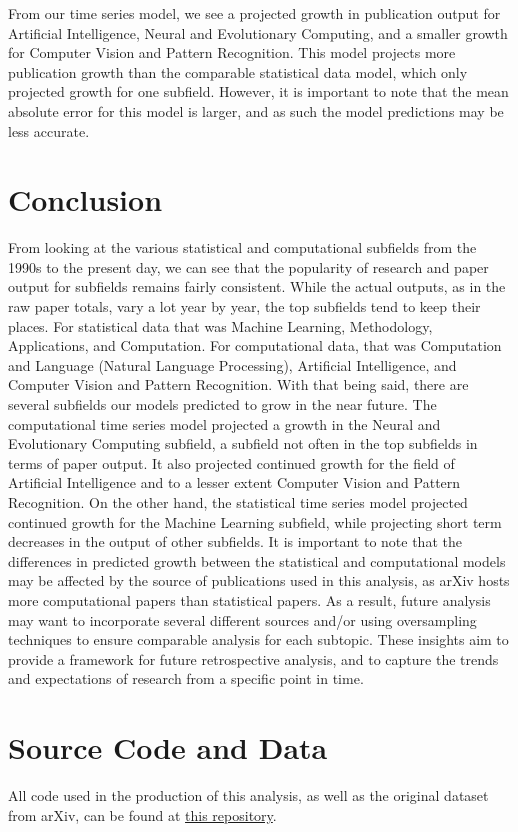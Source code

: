 \documentclass[
  12pt]{article}
\begin{document}
From our time series model, we see a projected growth in publication
output for Artificial Intelligence, Neural and Evolutionary Computing,
and a smaller growth for Computer Vision and Pattern Recognition. This
model projects more publication growth than the comparable statistical
data model, which only projected growth for one subfield. However, it is
important to note that the mean absolute error for this model is larger,
and as such the model predictions may be less accurate.

\section{Conclusion}\label{sec-conc}

From looking at the various statistical and computational subfields from
the 1990s to the present day, we can see that the popularity of research
and paper output for subfields remains fairly consistent. While the
actual outputs, as in the raw paper totals, vary a lot year by year, the
top subfields tend to keep their places. For statistical data that was
Machine Learning, Methodology, Applications, and Computation. For
computational data, that was Computation and Language (Natural Language
Processing), Artificial Intelligence, and Computer Vision and Pattern
Recognition. With that being said, there are several subfields our
models predicted to grow in the near future. The computational time
series model projected a growth in the Neural and Evolutionary Computing
subfield, a subfield not often in the top subfields in terms of paper
output. It also projected continued growth for the field of Artificial
Intelligence and to a lesser extent Computer Vision and Pattern
Recognition. On the other hand, the statistical time series model
projected continued growth for the Machine Learning subfield, while
projecting short term decreases in the output of other subfields. It is
important to note that the differences in predicted growth between the
statistical and computational models may be affected by the source of
publications used in this analysis, as arXiv hosts more computational
papers than statistical papers. As a result, future analysis may want to
incorporate several different sources and/or using oversampling
techniques to ensure comparable analysis for each subtopic. These
insights aim to provide a framework for future retrospective analysis,
and to capture the trends and expectations of research from a specific
point in time.

\section{Source Code and Data}\label{source-code-and-data}

All code used in the production of this analysis, as well as the
original dataset from arXiv, can be found at
\href{https://github.com/narenp12/stats140finalproj}{this repository}.


  
\end{document}
